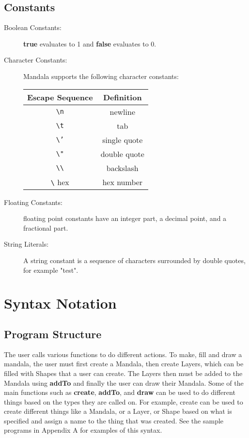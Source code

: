 \documentclass[12pt]{report}
\begin{document}
    \subsection*{Constants}
    \begin{description}
   \item[ Boolean Constants:] \textbf{true} evaluates to 1 and \textbf{false} evaluates to 0. 
\item[Character Constants:] Mandala supports the following character constants: 

\vspace{1cm}
\begin{tabular}{||c | c||} 
 \hline
 \textbf{Escape Sequence} & \textbf{Definition} \\
 \hline\hline
 \texttt{\textbackslash n} & newline  \\ 
 \hline 
 \texttt{\textbackslash t} & tab \\ 
 \hline 
 \texttt{\textbackslash '} & single quote  \\
 \hline
 \texttt{\textbackslash "} & double quote \\
 \hline
 \texttt{\textbackslash \textbackslash} & backslash  \\
 \hline
 \texttt{\textbackslash} hex & hex number  \\ 
 \hline
\end{tabular}

\vspace{1cm}
\item [Floating Constants:] floating point constants have an integer part, a decimal point, and a fractional part. 

\item[String Literals:] A string constant is a sequence of characters surrounded by double quotes, for example "test". 

	\end{description}
    
\newpage
{}
\section*{Syntax Notation}


	\subsection*{Program Structure}
    
    The user calls various functions to do different actions. To make, fill and draw a mandala, the user must first create a Mandala, then create Layers, which can be filled with Shapes that a user can create. The Layers then must be added to the Mandala using \textbf{addTo} and finally the user can draw their Mandala.
Some of the main functions such as \textbf{create}, \textbf{addTo}, and \textbf{draw} can be used to do different things based on the types they are called on. For example, create can be used to create different things like a Mandala, or a Layer, or  Shape based on what is specified and assign a name to the thing that was created. See the sample programs in Appendix A for examples of this syntax.
\end{document}

